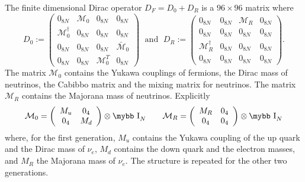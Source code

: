 \documentclass[11pt]{article}
\def\bb#1{\hbox{\mybb#1}}
\begin{document}
The finite dimensional Dirac operator $D_F = D_0 + D_R$ is a
$96\times96$ matrix where
\begin{equation}
D_0:=\left(\begin{array}{cccc}
0_{8N} & \mathcal{M}_0 & 0_{8N} & 0_{8N}\\
\mathcal{M}_0^{\dagger} & 0_{8N} & 0_{8N} & 0_{8N}\\
 0_{8N}& 0_{8N} & 0_{8N} & \bar{\mathcal{M}}_0\\
0_{8N} &0_{8N} & \mathcal{M}_0^{T} & 0_{8N}
\end{array}\right)\;\text{ and }\; 
D_R:=\left(\begin{array}{cccc}
0_{8N} & 0_{8N} & \mathcal{M}_{R} & 0_{8N}\\
0_{8N} & 0_{8N} & 0_{8N} & 0_{8N}\\
\mathcal{M}_{R} ^\dagger& 0_{8N} & 0_{8N} &0_{8N}\\
0_{8N} &0_{8N} & 0_{8N}& 0_{8N}
\end{array}\right).
\label{eq:D_F Modello Standard-1-1}
\end{equation}
The matrix $\mathcal{M}_0$ contains the Yukawa couplings of 
fermions, the Dirac mass of neutrinos, the Cabibbo matrix and the
mixing matrix for neutrinos. The matrix $\mathcal{M}_{R}$
contains the Majorana mass of neutrinos. Explicitly
\begin{equation}
\mathcal{M}_0  =  \left(\begin{array}{cc}
M_{u} & 0_{4}\\
0_{4} & M_{d}
\end{array}\right)\otimes \bb I_N\quad\quad
\mathcal{M}_{R}  =  \left(\begin{array}{cc}
M_{R} & 0_{4}\\
0_{4} & 0_{4}
\end{array}\right)\otimes \bb I_N
\end{equation}
where, for the first generation,  $M_{u}$ 
contains the Yukawa coupling of the up quark
 and the Dirac  mass of $\nu_e$, $M_{d}$ 
contains the down quark and  the electron masses, 
and $M_{R}$ the
Majorana mass of $\nu_e$. The structure is
repeated for the other two generations.
\end{document}
